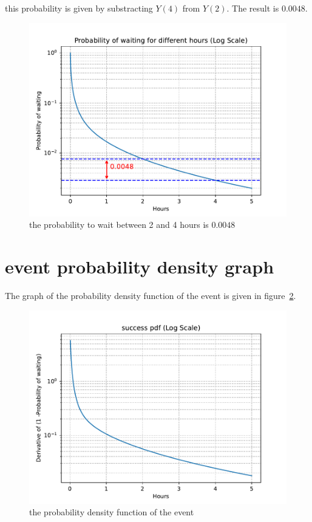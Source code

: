 this probability is given by substracting $Y(4)$ from $Y(2)$. The result is $0.0048$.

\begin{figure}[h]
\centering
\includegraphics[width=13cm]{code/figures/prob_waiting_2_4.pdf}
\caption{the probability to wait between 2 and 4 hours is $0.0048$ \label{fig:waiting}}
\end{figure}
\FloatBarrier

\section{event probability density graph}

The graph of the probability density function of the event is given in figure~\ref{fig:waiting}.
\begin{figure}[h]
\centering
\includegraphics[width=16cm]{code/figures/waiting_time_derivative.pdf}
\caption{the probability density function of the event \label{fig:waiting}}
\end{figure}
\FloatBarrier

